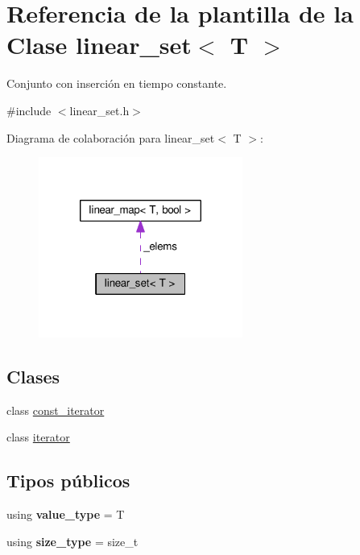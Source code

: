 \hypertarget{classlinear__set}{\section{Referencia de la plantilla de la Clase linear\-\_\-set$<$ T $>$}
\label{classlinear__set}
}


Conjunto con inserción en tiempo constante.  




{\ttfamily \#include $<$linear\-\_\-set.\-h$>$}



Diagrama de colaboración para linear\-\_\-set$<$ T $>$\-:
\nopagebreak
\begin{figure}[H]
\begin{center}
\leavevmode
\includegraphics[width=190pt]{classlinear__set__coll__graph}
\end{center}
\end{figure}
\subsection*{Clases}
\begin{DoxyCompactItemize}
\item 
class \hyperlink{classlinear__set_1_1const__iterator}{const\-\_\-iterator}
\item 
class \hyperlink{classlinear__set_1_1iterator}{iterator}
\end{DoxyCompactItemize}
\subsection*{Tipos públicos}
\begin{DoxyCompactItemize}
\item 
\hypertarget{classlinear__set_a3d7088f5ad3d506bc94ad0fa62c40fed}{using {\bfseries value\-\_\-type} = T}\label{classlinear__set_a3d7088f5ad3d506bc94ad0fa62c40fed}

\item 
\hypertarget{classlinear__set_a502855ac3cffe6a33ba8eed857bd14bf}{using {\bfseries size\-\_\-type} = size\-\_\-t}\label{classlinear__set_a502855ac3cffe6a33ba8eed857bd14bf}

\end{DoxyCompactItemize}
